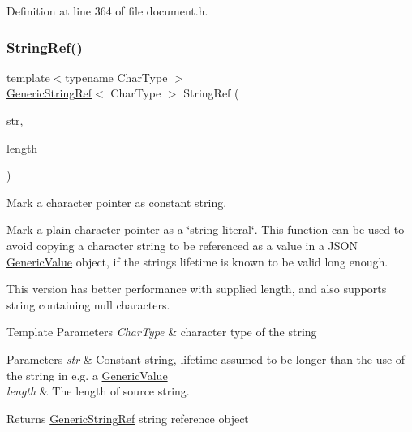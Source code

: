 Definition at line 364 of file document.\+h.


\begin{DoxyCode}{0}

\end{DoxyCode}
\mbox{\label{namespacerapidjson_a578c51ab574a50a9c760b9da7c7562f2}} 
\subsubsection{\texorpdfstring{StringRef()}{StringRef()}\hspace{0.1cm}{\footnotesize\ttfamily [2/2]}}
{\footnotesize\ttfamily template$<$typename Char\+Type $>$ \\
\mbox{\hyperlink{structrapidjson_1_1_generic_string_ref}{Generic\+String\+Ref}}$<$ Char\+Type $>$ String\+Ref (\begin{DoxyParamCaption}\item[{const Char\+Type $\ast$}]{str,  }\item[{size\+\_\+t}]{length }\end{DoxyParamCaption})}



Mark a character pointer as constant string. 

Mark a plain character pointer as a \char`\"{}string literal\char`\"{}. This function can be used to avoid copying a character string to be referenced as a value in a J\+S\+ON \mbox{\hyperlink{classrapidjson_1_1_generic_value}{Generic\+Value}} object, if the string\textquotesingle{}s lifetime is known to be valid long enough.

This version has better performance with supplied length, and also supports string containing null characters.


\begin{DoxyTemplParams}{Template Parameters}
{\em Char\+Type} & character type of the string \\
\hline
\end{DoxyTemplParams}

\begin{DoxyParams}{Parameters}
{\em str} & Constant string, lifetime assumed to be longer than the use of the string in e.\+g. a \mbox{\hyperlink{classrapidjson_1_1_generic_value}{Generic\+Value}} \\
\hline
{\em length} & The length of source string. \\
\hline
\end{DoxyParams}
\begin{DoxyReturn}{Returns}
\mbox{\hyperlink{structrapidjson_1_1_generic_string_ref}{Generic\+String\+Ref}} string reference object 
\end{DoxyReturn}


